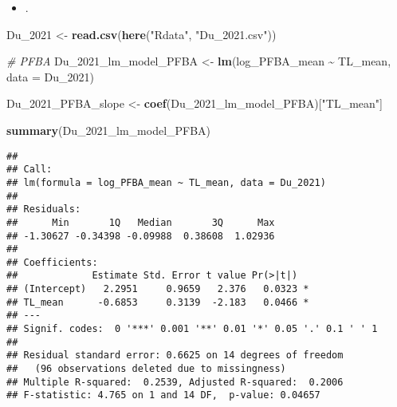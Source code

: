 \documentclass[
]{article}
\newenvironment{Shaded}{\begin{snugshade}}{\end{snugshade}}
\newcommand{\AttributeTok}[1]{\textcolor[rgb]{0.13,0.29,0.53}{#1}}
\newcommand{\CommentTok}[1]{\textcolor[rgb]{0.56,0.35,0.01}{\textit{#1}}}
\newcommand{\FunctionTok}[1]{\textcolor[rgb]{0.13,0.29,0.53}{\textbf{#1}}}
\newcommand{\NormalTok}[1]{#1}
\newcommand{\OtherTok}[1]{\textcolor[rgb]{0.56,0.35,0.01}{#1}}
\newcommand{\SpecialCharTok}[1]{\textcolor[rgb]{0.81,0.36,0.00}{\textbf{#1}}}
\newcommand{\StringTok}[1]{\textcolor[rgb]{0.31,0.60,0.02}{#1}}
\providecommand{\tightlist}{%
  \setlength{\itemsep}{0pt}\setlength{\parskip}{0pt}}
\begin{document}
\begin{itemize}
\tightlist
\item
  .
\end{itemize}

\begin{Shaded}
\begin{Highlighting}[]
\NormalTok{Du\_2021 }\OtherTok{\textless{}{-}} \FunctionTok{read.csv}\NormalTok{(}\FunctionTok{here}\NormalTok{(}\StringTok{"Rdata"}\NormalTok{, }\StringTok{"Du\_2021.csv"}\NormalTok{))}

\CommentTok{\# PFBA}
\NormalTok{Du\_2021\_lm\_model\_PFBA }\OtherTok{\textless{}{-}} \FunctionTok{lm}\NormalTok{(log\_PFBA\_mean }\SpecialCharTok{\textasciitilde{}}\NormalTok{ TL\_mean,}
                             \AttributeTok{data =}\NormalTok{ Du\_2021)}

\NormalTok{Du\_2021\_PFBA\_slope }\OtherTok{\textless{}{-}} \FunctionTok{coef}\NormalTok{(Du\_2021\_lm\_model\_PFBA)[}\StringTok{"TL\_mean"}\NormalTok{]}

\FunctionTok{summary}\NormalTok{(Du\_2021\_lm\_model\_PFBA)}
\end{Highlighting}
\end{Shaded}

\begin{verbatim}
## 
## Call:
## lm(formula = log_PFBA_mean ~ TL_mean, data = Du_2021)
## 
## Residuals:
##      Min       1Q   Median       3Q      Max 
## -1.30627 -0.34398 -0.09988  0.38608  1.02936 
## 
## Coefficients:
##             Estimate Std. Error t value Pr(>|t|)  
## (Intercept)   2.2951     0.9659   2.376   0.0323 *
## TL_mean      -0.6853     0.3139  -2.183   0.0466 *
## ---
## Signif. codes:  0 '***' 0.001 '**' 0.01 '*' 0.05 '.' 0.1 ' ' 1
## 
## Residual standard error: 0.6625 on 14 degrees of freedom
##   (96 observations deleted due to missingness)
## Multiple R-squared:  0.2539, Adjusted R-squared:  0.2006 
## F-statistic: 4.765 on 1 and 14 DF,  p-value: 0.04657
\end{verbatim}
\end{document}
